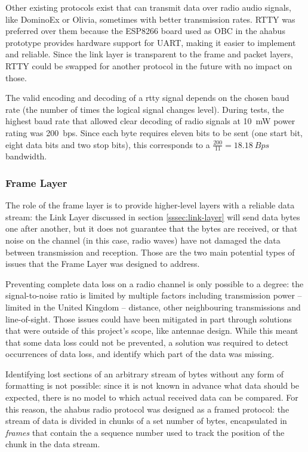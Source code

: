 Other existing protocols exist that can transmit data over radio audio signals,
like DominoEx or Olivia, sometimes with better transmission rates. RTTY was
preferred over them because the ESP8266 board used as OBC in the \acrshort{ahabus}
prototype provides hardware support for UART, making it easier to implement and
reliable. Since the link layer is transparent to the frame and packet layers,
RTTY could be swapped for another protocol in the future with no impact on
those.

The valid encoding and decoding of a \acrshort{rtty} signal depends on the
chosen baud rate (the number of times the logical signal changes level). During
tests, the highest baud rate that allowed clear decoding of radio signals at
\SI{10}{mW} power rating was \SI{200}{bps}. Since each byte requires eleven
bits to be sent (one start bit, eight data bits and two stop bits), this
corresponds to a \(\frac{200}{11}=\SI{18.18}{Bps}\) bandwidth.

\subsubsection{Frame Layer}
\label{sssec:frame-layer}

The role of the frame layer is to provide higher-level layers with a reliable
data stream: the Link Layer discussed in section \ref{sssec:link-layer} will
send data bytes one after another, but it does not guarantee that the bytes are
received, or that noise on the channel (in this case, radio waves) have not
damaged the data between transmission and reception. Those are the two main
potential types of issues that the Frame Layer was designed to address.

Preventing complete data loss on a radio channel is only possible to a degree:
the signal-to-noise ratio is limited by multiple factors including transmission
power – limited in the United Kingdom – distance, other neighbouring
transmissions and line-of-sight. Those issues could have been mitigated in part
through solutions that were outside of this project's scope, like antennae
design. While this meant that some data loss could not be prevented, a solution
was required to detect occurrences of data loss, and identify which part of the
data was missing.

Identifying lost sections of an arbitrary stream of bytes without any form of
formatting is not possible: since it is not known in advance what data should
be expected, there is no model to which actual received data can be compared.
For this reason, the \acrshort{ahabus} radio protocol was designed as a framed protocol:
the stream of data is divided in chunks of a set number of bytes, encapsulated
in \textit{frames} that contain the a sequence number used to track the position
of the chunk in the data stream.

